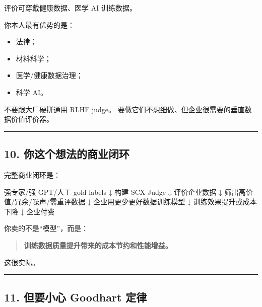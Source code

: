 \documentclass[
  12pt,
]{ctexart}
\newenvironment{Shaded}{}{}
\newcommand{\NormalTok}[1]{#1}
\providecommand{\tightlist}{%
  \setlength{\itemsep}{0pt}\setlength{\parskip}{0pt}}
\begin{document}
评价可穿戴健康数据、医学 AI 训练数据。

你本人最有优势的是：

\begin{itemize}
\tightlist
\item
  法律；
\item
  材料科学；
\item
  医学/健康数据治理；
\item
  科学 AI。
\end{itemize}

不要跟大厂硬拼通用 RLHF judge。
要做它们不想细做、但企业很需要的垂直数据价值评价器。

\begin{center}\rule{0.5\linewidth}{0.5pt}\end{center}

\subsection{10.
你这个想法的商业闭环}\label{ux4f60ux8fd9ux4e2aux60f3ux6cd5ux7684ux5546ux4e1aux95edux73af}

完整商业闭环是：

\begin{Shaded}
\begin{Highlighting}[]
\NormalTok{强专家/强 GPT/人工 gold labels}
\NormalTok{        ↓}
\NormalTok{构建 SCX{-}Judge}
\NormalTok{        ↓}
\NormalTok{评价企业数据}
\NormalTok{        ↓}
\NormalTok{筛出高价值/冗余/噪声/需重评数据}
\NormalTok{        ↓}
\NormalTok{企业用更少更好数据训练模型}
\NormalTok{        ↓}
\NormalTok{训练效果提升或成本下降}
\NormalTok{        ↓}
\NormalTok{企业付费}
\end{Highlighting}
\end{Shaded}

你卖的不是``模型''，而是：

\begin{quote}
\textbf{训练数据质量提升带来的成本节约和性能增益。}
\end{quote}

这很实际。

\begin{center}\rule{0.5\linewidth}{0.5pt}\end{center}

\subsection{11. 但要小心 Goodhart
定律}\label{ux4f46ux8981ux5c0fux5fc3-goodhart-ux5b9aux5f8b}
\end{document}
